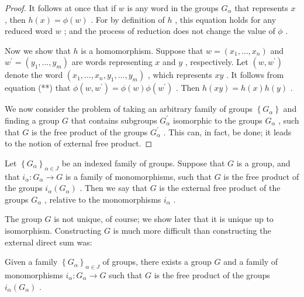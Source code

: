 \begin{proof}
It follows at once that if \(w\) is any word in the groups \({G}_{\alpha }\) that represents \(x\) , then \(h\left( x\right)  = \phi \left( w\right)\) . For by definition of \(h\) , this equation holds for any reduced word \(w\) ; and the process of reduction does not change the value of \(\phi\) .

Now we show that \(h\) is a homomorphism. Suppose that \(w = \left( {{x}_{1},\ldots ,{x}_{n}}\right)\) and \({w}^{\prime } = \left( {{y}_{1},\ldots ,{y}_{m}}\right)\) are words representing \(x\) and \(y\) , respectively. Let \(\left( {w,{w}^{\prime }}\right)\) denote the word \(\left( {{x}_{1},\ldots ,{x}_{n},{y}_{1},\ldots ,{y}_{m}}\right)\) , which represents \({xy}\) . It follows from equation (**) that \(\phi \left( {w,{w}^{\prime }}\right)  = \phi \left( w\right) \phi \left( {w}^{\prime }\right)\) . Then \(h\left( {xy}\right)  = h\left( x\right) h\left( y\right)\) .

We now consider the problem of taking an arbitrary family of groups \(\left\{  {G}_{\alpha }\right\}\) and finding a group \(G\) that contains subgroups \({G}_{\alpha }^{\prime }\) isomorphic to the groups \({G}_{\alpha }\) , such that \(G\) is the free product of the groups \({G}_{\alpha }^{\prime }\) . This can, in fact, be done; it leads to the notion of external free product.
\end{proof}
\begin{definition} Let \({\left\{  {G}_{\alpha }\right\}  }_{\alpha  \in  J}\) be an indexed family of groups. Suppose that \(G\) is a group, and that \({i}_{\alpha } : {G}_{\alpha } \rightarrow  G\) is a family of monomorphisms, such that \(G\) is the free product of the groups \({i}_{\alpha }\left( {G}_{\alpha }\right)\) . Then we say that \(G\) is the external free product of the groups \({G}_{\alpha }\) , relative to the monomorphisms \({i}_{\alpha }\) .
\end{definition}

The group \(G\) is not unique, of course; we show later that it is unique up to isomorphism. Constructing \(G\) is much more difficult than constructing the external direct sum was:

\begin{theorem} Given a family \({\left\{  {G}_{\alpha }\right\}  }_{\alpha  \in  J}\) of groups, there exists a group \(G\) and a family of monomorphisms \({i}_{\alpha } : {G}_{\alpha } \rightarrow  G\) such that \(G\) is the free product of the groups \({i}_{\alpha }\left( {G}_{\alpha }\right)\) .
\end{theorem}

